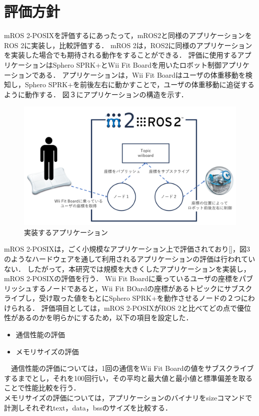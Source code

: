 \documentclass[11pt]{ujarticle}
\begin{document}
\section{評価方針}
mROS 2-POSIXを評価するにあったって，mROS2と同様のアプリケーションをROS 2に実装し，比較評価する．
mROS 2は，ROS2に同様のアプリケーションを実装した場合でも期待される動作をすることができる．
評価に使用するアプリケーションはSphero SPRK+とWii Fit Boardを用いたロボット制御アプリケーションである．
アプリケーションは，Wii Fit Boardはユーザの体重移動を検知し，Sphero SPRK+を前後左右に動かすことで，ユーザの体重移動に追従するように動作する．
図３にアプリケーションの構造を示す．
\begin{figure}[t]
	\centering
	\includegraphics[width=0.8\linewidth]{./src/fig3_application_structure.png}
	\caption{実装するアプリケーション}
  \label{fig:arch}
\end{figure}
mROS 2-POSIXは，ごく小規模なアプリケーション上で評価されており[]，図3のようなハードウェアを通して利用されるアプリケーションの評価は行われていない．
したがって，本研究では規模を大きくしたアプリケーションを実装し，mROS 2-POSIXの評価を行う．
Wii Fit Boardに乗っているユーザの座標をパブリッシュするノードであると，Wii Fit BOardの座標があるトピックにサブスクライブし，受け取った値をもとにSphero SPRK+を動作させるノードの２つにわけられる．
評価項目としては，mROS 2-POSIXがROS 2と比べてどの点で優位性があるのかを明らかにするため，以下の項目を設定した．
\begin{itemize}
	\item 通信性能の評価
	\item メモリサイズの評価
\end{itemize}
　通信性能の評価については，1回の通信をWii Fit Boardの値をサブスクライブするまでとし，それを100回行い，その平均と最大値と最小値と標準偏差を取ることで性能比較を行う．
\\メモリサイズの評価については，アプリケーションのバイナリをsizeコマンドで計測しそれぞれtext，data，bssのサイズを比較する．
\end{document}
